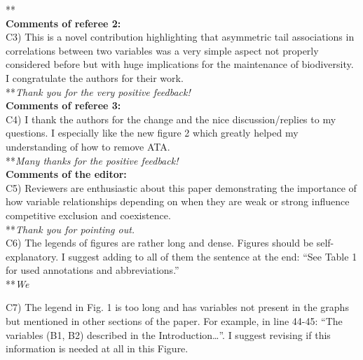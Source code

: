 \documentclass[letterpaper,11pt]{article}
\begin{document}
\noindent ***\emph{} \\


\noindent \textbf{Comments of referee 2:} \\

\noindent C3) This is a novel contribution highlighting that asymmetric tail associations in correlations between two variables was a very simple aspect not properly considered before but with huge implications for the maintenance of biodiversity. I congratulate the authors for their work. \\

\noindent ***\emph{Thank you for the very positive feedback!} \\

\noindent \textbf{Comments of referee 3:} \\

\noindent C4) I thank the authors for the change and the nice discussion/replies to my questions. I especially like the new figure 2 which greatly helped my understanding of how to remove ATA. \\
  
\noindent ***\emph{Many thanks for the positive feedback!} \\

\noindent \textbf{Comments of the editor:} \\

\noindent C5) Reviewers are enthusiastic about this paper demonstrating the importance of how variable relationships depending on when they are weak or strong influence competitive exclusion and coexistence. \\

\noindent ***\emph{Thank you for pointing out.} \\

\noindent C6) The legends of figures are rather long and dense. Figures should be self-explanatory. I suggest adding to all of them the sentence at the end: “See Table 1 for used annotations and abbreviations.” \\

\noindent ***\emph{We }

\noindent C7) The legend in Fig. 1 is too long and has variables not present in the graphs but mentioned in other sections of the paper. For example, in line 44-45: “The variables (B1, B2) described in the Introduction…”. I suggest revising if this information is needed at all in this Figure. \\
\end{document}
